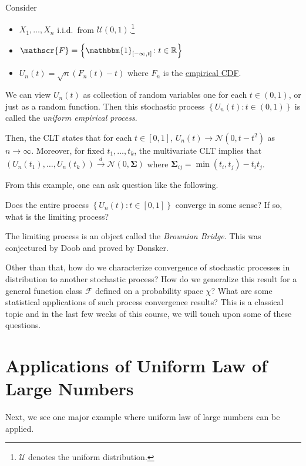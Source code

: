 \begin{eg}
	Consider
	\begin{itemize}
		\item \(X_1, \dots , X_n\) i.i.d.\ from \(\mathcal{U} (0, 1)\).\footnote{\(\mathcal{U}\) denotes the uniform distribution.}
		\item \(\mathscr{F} = \left\{ \mathbbm{1}_{[-\infty , t]} \colon t\in \mathbb{R}  \right\} \)
		\item \(U_n(t) = \sqrt{n} (F_n(t) - t) \) where \(F_n\) is the \hyperref[def:empirical-CDF]{empirical CDF}.
	\end{itemize}
	We can view \(U_n(t) \) as collection of random variables one for each \(t\in (0, 1)\), or just as a random function. Then this stochastic process \(\left\{ U_n(t)\colon t\in (0, 1) \right\} \) is called the \emph{uniform empirical process}.

	Then, the CLT states that for each \(t\in [0, 1]\), \(U_n(t) \to \mathcal{N} (0, t - t^2)\) as \(n \to \infty \). Moreover, for fixed \(t_1, \dots , t_k\), the multivariate CLT implies that \((U_n(t_1), \dots , U_n(t_k)) \overset{d}{\to } \mathcal{N} (0, \mathbf{\Sigma} ) \) where \(\mathbf{\Sigma} _{ij} = \min (t_i, t_j) - t_i t_j\).
\end{eg}

From this example, one can ask question like the following.

\begin{problem*}
	Does the entire process \(\left\{ U_n(t)\colon t\in [0, 1] \right\} \) converge in some sense? If so, what is the limiting process?
\end{problem*}
\begin{answer}
	The limiting process is an object called the \emph{Brownian Bridge}. This was conjectured by Doob and proved by Donsker.
\end{answer}

Other than that, how do we characterize convergence of stochastic processes in distribution to another stochastic process? How do we generalize this result for a general function class \(\mathscr{F} \) defined on a probability space \(\chi \)? What are some statistical applications of such process convergence results? This is a classical topic and in the last few weeks of this course, we will touch upon some of these questions.

\section{Applications of Uniform Law of Large Numbers}
Next, we see one major example where uniform law of large numbers can be applied.


